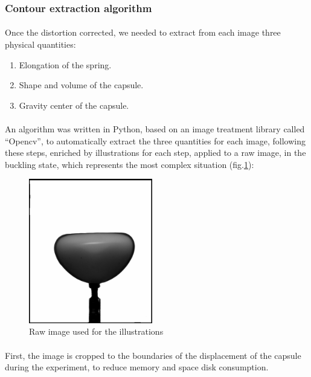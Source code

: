 \subsubsection{Contour extraction algorithm}
\paragraph{}
Once the distortion corrected, we needed to extract from each image three physical quantities:
\begin{enumerate}
	\item Elongation of the spring.
	\item Shape and volume of the capsule.
	\item Gravity center of the capsule.
\end{enumerate}
\paragraph{}
An algorithm was written in Python, based on an image treatment library called "`Opencv"', to automatically extract the three quantities for each image, following these steps, enriched by illustrations for each step, applied to a raw image, in the buckling state, which represents the most complex  situation (fig.\ref{fig:raw_image}):
\begin{figure}[H] %
	\centering%
  \includegraphics[width=0.48\textwidth]{figures/Chapter_1/raw_image.png}
	\caption{Raw image used for the illustrations}
	\label{fig:raw_image}
\end{figure}
\paragraph{}
First, the image is cropped to the boundaries of the displacement of the capsule during the experiment, to reduce memory and space disk consumption.
